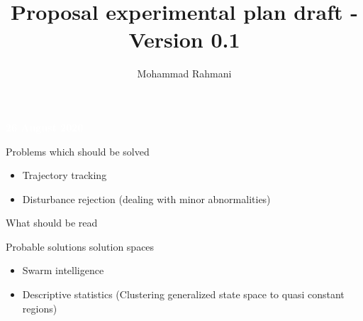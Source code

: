 \documentclass[unknownkeysallowed]{beamer}
\title{Proposal experimental plan draft - Version 0.1}
\author{Mohammad Rahmani}
\institute{DECIDE Doctoral School}
\begin{document}
	\begin{frame}
		\date{}
		\maketitle
		\textcolor{white}{\textbf{26 August 2020}}
	\end{frame}

	\begin{frame}{Problems which should be solved}
		\begin{itemize}
			\item Trajectory tracking
			\item Disturbance rejection (dealing with minor abnormalities)
		\end{itemize}
	\end{frame}

	\begin{frame}{What should be read}
	\end{frame}

	\begin{frame}{Probable solutions solution spaces}
		\begin{itemize}
			\item Swarm intelligence
			\item Descriptive statistics (Clustering generalized state space to quasi constant regions)
		\end{itemize}
	\end{frame}
\end{document}
